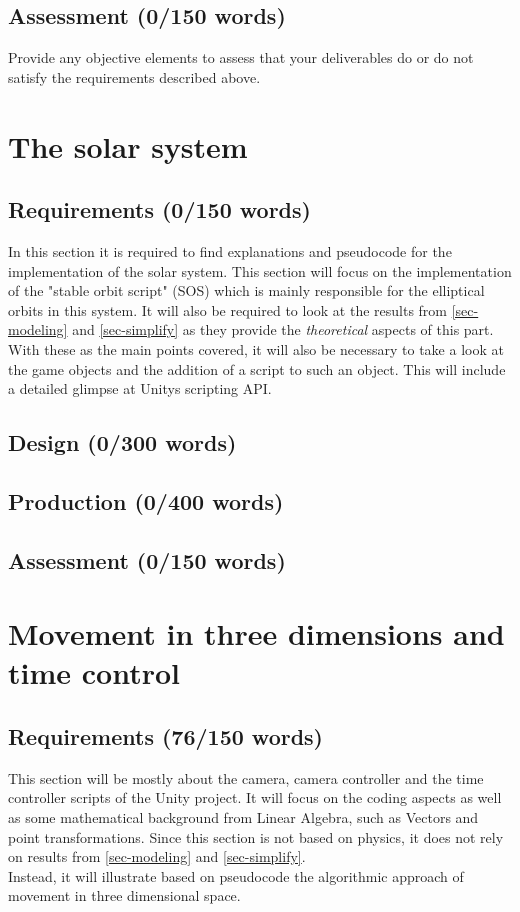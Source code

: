 \documentclass[conference,compsoc]{IEEEtran}
\begin{document}
\subsection{Assessment (0/150 words)}
Provide any objective elements to assess that your deliverables do or do not satisfy the requirements described above. 

\section{The solar system}
\label{sec-solar system}
\subsection{Requirements (0/150 words)}
In this section it is required to find explanations and pseudocode for the implementation of the solar system. This section will focus on the implementation of the "stable orbit script" (SOS) which is mainly responsible for the elliptical orbits in this system. It will also be required to look at the results from \ref{sec-modeling} and \ref{sec-simplify} as they provide the \emph{theoretical} aspects of this part. With these as the main points covered, it will also be necessary to take a look at the game objects and the addition of a script to such an object. This will include a detailed glimpse at Unitys scripting API. 
\subsection{Design (0/300 words)}
\subsection{Production (0/400 words)}
\subsection{Assessment (0/150 words)}

\section{Movement in three dimensions and time control}
\label{sec-movement-in-3D}
\subsection{Requirements (76/150 words)}
This section will be mostly about the camera, camera controller and the time controller scripts of the Unity project. It will focus on the coding aspects as well as some mathematical background from Linear Algebra, such as Vectors and point transformations. Since this section is not based on physics, it does not rely on results from \ref{sec-modeling} and \ref{sec-simplify}.\\
Instead, it will illustrate based on pseudocode the algorithmic approach of movement in three dimensional space. \\
\end{document}
